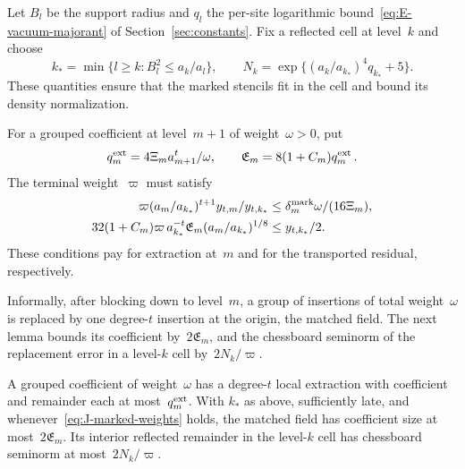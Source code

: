 Let $B_l$ be the support radius and $q_l$ the per-site logarithmic bound~\eqref{eq:E-vacuum-majorant} of Section~\ref{sec:constants}. Fix a reflected cell at level~$k$ and choose
\begin{equation*}
k_*=\min\{l\ge k:B_l^2\le a_k/a_l\},\qquad
N_k=\exp\{(a_k/a_{k_*})^4q_{k_*}+5\}.
\end{equation*}
These quantities ensure that the marked stencils fit in the cell and bound its density normalization.

For a grouped coefficient at level~$m+1$ of weight~$\omega>0$, put
\begin{equation*}
q^{\rm ext}_m=4\Xi_ma_{m+1}^t/\omega,\qquad \mathfrak E_m=8(1+C_m)q^{\rm ext}_m\,.
\end{equation*}
The terminal weight~$\varpi$ must satisfy
\begin{equation}\label{eq:J-marked-weights}
\begin{aligned}
\varpi(a_m/a_{k_*})^{t+1}y_{t,m}/y_{t,k_*}
 &\le\delta_m^{\rm mark}\omega/(16\Xi_m),\\
32(1+C_m)\varpi\,a_{k_*}^{-t}\mathfrak E_m(a_m/a_{k_*})^{1/8}
 &\le y_{t,k_*}/2.
\end{aligned}
\end{equation}
These conditions pay for extraction at~$m$ and for the transported residual, respectively.

Informally, after blocking down to level~$m$, a group of insertions of total weight~$\omega$ is replaced by one degree-$t$ insertion at the origin, the matched field. The next lemma bounds its coefficient by~$2\mathfrak E_m$, and the chessboard seminorm of the replacement error in a level-$k$ cell by~$2N_k/\varpi$.

\begin{lemma}\label{lem:J-marked-costs}
A grouped coefficient of weight~$\omega$ has a degree-$t$ local extraction with coefficient and remainder each at most~$q^{\rm ext}_m$. With $k_*$ as above, sufficiently late, and whenever~\eqref{eq:J-marked-weights} holds, the matched field has coefficient size at most~$2\mathfrak E_m$. Its interior reflected remainder in the level-$k$ cell has chessboard seminorm at most~$2N_k/\varpi$.
\end{lemma}

